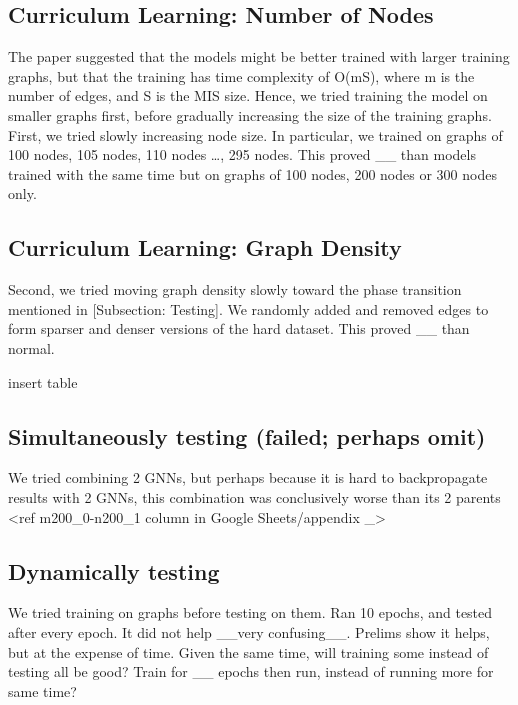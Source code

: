 \documentclass{article}
\begin{document}
\subsection{Curriculum Learning: Number of Nodes}
The paper suggested that the models might be better trained with larger training graphs, but that the training has time complexity of O(mS), where m is the number of edges, and S is the MIS size. Hence, we tried training the model on smaller graphs first, before gradually increasing the size of the training graphs.
First, we tried slowly increasing node size. In particular, we trained on graphs of 100 nodes, 105 nodes, 110 nodes …, 295 nodes. This proved __ than models trained with the same time but on graphs of 100 nodes, 200 nodes or 300 nodes only.

\subsection{Curriculum Learning: Graph Density}
Second, we tried moving graph density slowly toward the phase transition mentioned in [Subsection: Testing]. We randomly added and removed edges to form sparser and denser versions of the hard dataset. This proved __ than normal.



insert table




\subsection{Simultaneously testing (failed; perhaps omit)}
We tried combining 2 GNNs, but perhaps because it is hard to backpropagate results with 2 GNNs, this combination was conclusively worse than its 2 parents
<ref m200_0-n200_1 column in Google Sheets/appendix _>
\subsection{Dynamically testing}
We tried training on graphs before testing on them. Ran 10 epochs, and tested after every epoch. It did not help __very confusing__.
Prelims show it helps, but at the expense of time. Given the same time, will training some instead of testing all be good?
Train for __ epochs then run, instead of running more for same time?
\end{document}
